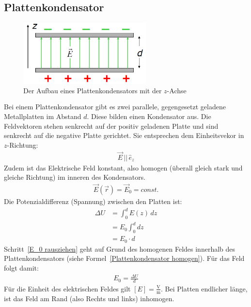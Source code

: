 \documentclass{article}
\begin{document}
\subsection{Plattenkondensator}
\begin{figure}[H]
    \centering
    \includegraphics[width=0.6\textwidth]{Plattenkondensator.png}
    \caption{Der Aufbau eines Plattenkondensators mit der $z$-Achse}
\end{figure}
Bei einem Plattenkondensator gibt es zwei parallele, gegengesetzt geladene Metallplatten im Abstand $d$.
Diese bilden einen Kondensator aus.
Die Feldvektoren stehen senkrecht auf der positiv geladenen Platte und sind senkrecht auf die negative Platte gerichtet.
Sie entsprechen dem Einheitsvekor in $z$-Richtung:
\begin{align}
    \vec{E}\,||\,\hat{e}_z
\end{align}
Zudem ist das Elektrische Feld konstant, also homogen (überall gleich stark und gleiche Richtung) im inneren des Kondensators.
\begin{align}
    \vec{E}(\vec{r})=\vec{E}_0=const.\label{Plattenkondensator homogen}
\end{align}
Die Potenzialdifferenz (Spannung) zwischen den Platten ist:
\begin{align}
    \Delta U&=\int_0^d E(z)\,dz\\
    &=E_0\int_{0}^{d}dz\label{E_0 rausziehen}\\
    &=E_0\cdot d
\end{align}
Schritt~\ref{E_0 rausziehen} geht auf Grund des homogenen Feldes innerhalb des Plattenkondensators (siehe Formel~\ref{Plattenkondensator homogen}).
Für das Feld folgt damit:
\begin{align}
    E_0=\frac{\Delta U}{d}
\end{align}
Für die Einheit des elektrischen Feldes gilt $[E]=\frac{\mathrm{V}}{\mathrm{m}}$.
Bei Platten endlicher länge, ist das Feld am Rand (also Rechts und links) inhomogen.
\end{document}
